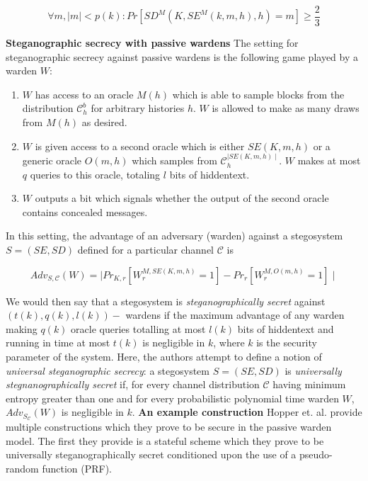 \documentclass{article}
\begin{document}
\[ \forall m, \mid m \mid < p(k): Pr[SD^M(K,SE^M(k,m,h),h) = m] \geq \frac{2}{3} \]

\noindent \textbf{Steganographic secrecy with passive wardens } The setting for 
steganographic secrecy against passive wardens is the  following game played by a 
warden $W$:

\begin{enumerate}
\item{$W$ has access to an oracle $M(h)$ which is able to sample blocks from the distribution 
$\mathcal{C}_h^{b}$ for arbitrary histories $h$.  $W$ is allowed to make as many draws from $M(h)$ as 
desired.}
\item{$W$ is given access to a second oracle which is either $SE(K,m,h)$ or a generic oracle 
$O(m,h)$ which samples from $\mathcal{C}_h^{\mid SE(K,m,h)\mid}$.  $W$ makes at most $q$ queries to this 
oracle, totaling $l$ bits of hiddentext.}
\item{$W$ outputs a bit which signals whether the output of the second oracle contains concealed 
messages.} 
\end{enumerate} 

In this setting, the advantage of an adversary (warden) against a stegosystem $S=(SE,SD)$ defined for a 
particular channel $\mathcal{C}$ is 

\[ Adv_{S,\mathcal{C}}(W) = \mid Pr_{K,r}[W_r^{M,SE(K,m,h)} = 1] - Pr_{r}[W_r^{M,O(m,h)} = 1] \mid \]

We would then say that a stegosystem is \textit{steganographically secret} against $(t(k), q(k), l(k))-$ wardens 
if the maximum advantage of any warden making $q(k)$ oracle queries totalling at most $l(k)$ bits of hiddentext and running in time at most $t(k)$ is negligible in $k$, where $k$ is the security parameter of the system.  Here, the authors attempt to define a notion of \textit{universal steganographic secrecy}: a stegosystem $S=(SE,SD)$ is \textit{universally stegnanographically secret} if, for every channel distribution $\mathcal{C}$ having minimum entropy greater than one and for every probabilistic polynomial time warden $W$, $Adv_{S_\mathcal{C}}(W)$ is negligible in $k$.
\newline\newline
\noindent \textbf{An example construction } Hopper et. al. provide multiple constructions which they prove to 
be secure in the passive warden model.  The first they provide is a stateful scheme which they prove to 
be universally steganographically secret conditioned upon the use of a pseudo-random function (PRF).
\end{document}
